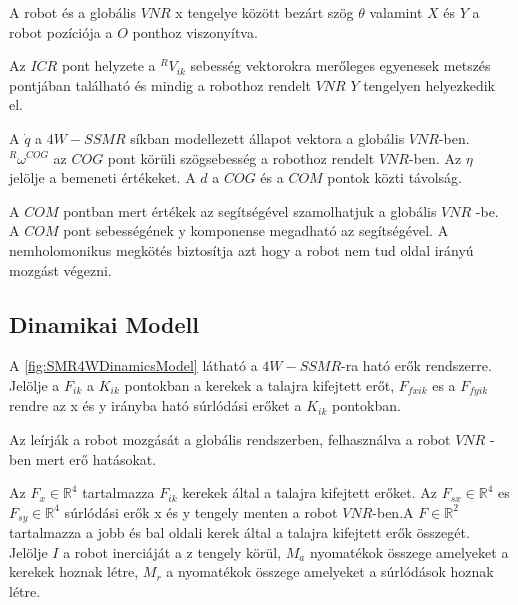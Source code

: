 A robot és a globális $VNR$ x tengelye között bezárt szög $\theta$ valamint $X$ és $Y$ a robot pozíciója a $O$ ponthoz viszonyítva.

Az $ICR$ pont helyzete a $^RV_{ik}$ sebesség vektorokra merőleges egyenesek metszés pontjában található és mindig a robothoz rendelt $VNR$ $Y$ tengelyen helyezkedik el.

\renewcommand{\img}{SajatRobot/SzerkAbrak/robot4wSebModel_seb.jpg}
\renewcommand{\sources}{*}
\renewcommand{\captionn}{Kinematikai modell az $4W-SSMR$ típusú robotnak.}
\renewcommand{\figlabel}{SMR4WKinematics}


A $\dot q$ a $4W-SSMR$ síkban modellezett állapot vektora a globális $VNR$-ben. $^R \omega^{COG}$ az $COG$ pont körüli szögsebesség a robothoz rendelt $VNR$-ben. Az $\eta$ jelölje a bemeneti értékeket.
A $d$ a $COG$ és a $COM$ pontok közti távolság.

A $COM$ pontban mert értékek az  segítségével szamolhatjuk a globális $VNR$ -be.
A $COM$ pont sebességének y komponense megadható az  segítségével.
A nemholomonikus megkötés  biztosítja azt hogy a robot nem tud oldal irányú mozgást végezni.





\subsection{Dinamikai Modell} 

A \ref{fig:SMR4WDinamicsModel} látható a $4W-SSMR$-ra ható erők rendszerre. Jelölje a $F_{ik}$ a $K_{ik}$ pontokban a kerekek a talajra kifejtett erőt, $F_{fxik}$ es a $F_{fyik}$ rendre az x és y irányba ható súrlódási erőket a $K_{ik}$ pontokban.

Az  leírják a robot mozgását a globális rendszerben, felhasználva a robot $VNR$ - ben mert erő hatásokat.

\renewcommand{\img}{SajatRobot/SzerkAbrak/robot4wDinamic.jpg}
\renewcommand{\sources}{*}
\renewcommand{\captionn}{Kinematikai modell az $SSMR$ típusú $MR$ robotnak.}
\renewcommand{\figlabel}{SMR4WDinamicsModel}


Az $F_x \in \mathbb{R}^4$ tartalmazza $F_{ik}$ kerekek által a talajra kifejtett erőket. Az $F_{sx} \in \mathbb{R}^4$ es $F_{sy} \in \mathbb{R}^4$ súrlódási erők x és y tengely menten a robot $VNR$-ben.A $F \in \mathbb{R}^2$ tartalmazza a jobb és bal oldali kerek által a talajra kifejtett erők összegét. Jelölje $I$ a robot inerciáját a z tengely körül, $M_a$ nyomatékok összege amelyeket a kerekek hoznak létre, $M_r$ a nyomatékok összege amelyeket a súrlódások hoznak létre. 


